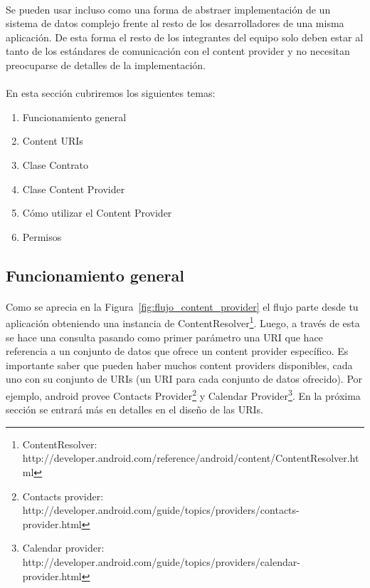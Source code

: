 \documentclass[10pt]{extarticle}
\begin{document}
\paragraph{}
Se pueden usar incluso como una forma de abstraer implementación de un sistema de datos complejo frente al resto de los desarrolladores de una misma aplicación. De esta forma el resto de los integrantes del equipo solo deben estar al tanto de los estándares de comunicación con el content provider y no necesitan preocuparse de detalles de la implementación. 

\paragraph{}
En esta sección cubriremos los siguientes temas:
\begin{enumerate}
	\item Funcionamiento general
	\item Content URIs
	\item Clase Contrato
	\item Clase Content Provider
	\item Cómo utilizar el Content Provider
	\item Permisos
\end{enumerate}

\subsection{Funcionamiento general}

\paragraph{}
Como se aprecia en la Figura~\ref{fig:flujo_content_provider} el flujo parte desde tu aplicación obteniendo una instancia de ContentResolver\footnote{ContentResolver: http://developer.android.com/reference/android/content/ContentResolver.html}. Luego, a través de esta se hace una consulta pasando como primer parámetro una URI que hace referencia a un conjunto de datos que ofrece un content provider específico. Es importante saber que pueden haber muchos content providers disponibles, cada uno con su conjunto de URIs (un URI para cada conjunto de datos ofrecido). Por ejemplo, android provee Contacts Provider\footnote{Contacts provider: http://developer.android.com/guide/topics/providers/contacts-provider.html} y Calendar Provider\footnote{Calendar provider: http://developer.android.com/guide/topics/providers/calendar-provider.html}. En la próxima sección se entrará más en detalles en el diseño de las URIs.
\end{document}
